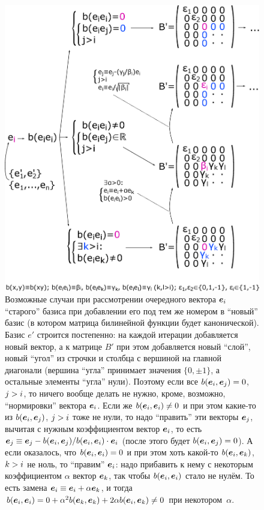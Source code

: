 \documentclass[a4paper,12pt]{article}
\begin{document}
  \begin{figure}[h!]
    \centering
  
    \includegraphics[width=0.85\columnwidth]{sym-bili-diag-scheme}
  
    \caption{Возможные случаи при рассмотрении очередного вектора $\boldsymbol e_i$ ``старого'' базиса при добавлении его под тем же номером в ``новый'' базис (в котором матрица билинейной функции будет канонической). Базис $e'$ строится постепенно: на каждой итерации добавляется новый вектор, а к матрице $B'$ при этом добавляется новый ``слой'', новый ``угол'' из строчки и столбца с вершиной на главной диагонали (вершина ``угла'' принимает значения $\{0, \pm 1\}$, а остальные элементы ``угла'' нули). Поэтому если все $b(\bds e_i, \bds e_j) \hm= 0$, $j \hm> i$, то ничего вообще делать не нужно, кроме, возможно, ``нормировки'' вектора $\boldsymbol e_i$. Если же $b(\bds e_i, \bds e_i) \hm{\not=} 0$ и при этом какие-то из $b(\boldsymbol e_i, \boldsymbol e_j)$, $j \hm> i$ тоже не нули, то надо ``править'' эти векторы $\boldsymbol e_j$, вычитая с нужным коэффициентом вектор $\boldsymbol e_i$, то есть $\bds e_j \hm\equiv \bds e_j \hm- b(\bds e_i, \bds e_j) \hm/ b(\bds e_i, \bds e_i) \hm\cdot \bds e_i$ (после этого будет $b(\bds e_i, \bds e_j) \hm= 0$). А если оказалось, что $b(\bds e_i, \bds e_i) \hm= 0$ и при этом хоть какой-то $b(\boldsymbol e_i, \boldsymbol e_k)$, $k \hm> i$ не ноль, то ``правим'' $\boldsymbol e_i$: надо прибавить к нему с некоторым коэффициентом $\alpha$ вектор $\boldsymbol e_k$, так чтобы $b(\boldsymbol e_i, \boldsymbol e_i)$ стало не нулём. То есть замена $\bds e_i \hm\equiv \bds e_i \hm+ \alpha \bds e_k$, и тогда $b(\bds e_i, \bds e_i) \hm= 0 \hm+ \alpha^2 b(\bds e_k, \bds e_k) \hm+ 2 \alpha b(\bds e_i, \bds e_k) \hm{\not=} 0$ при некотором~$\alpha$.}
    \label{fig:sym-bili-diag-scheme}
  \end{figure}
  
\end{document}
